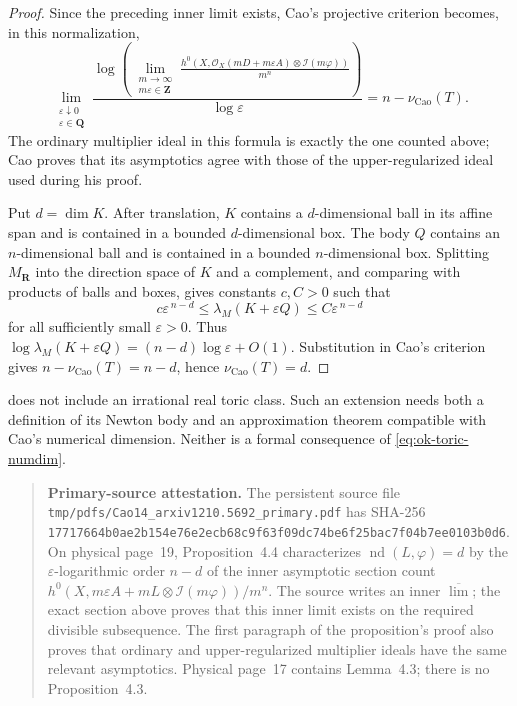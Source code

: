 \begin{proof}
Since the preceding inner limit exists, Cao's projective criterion
\cite[Proposition~4.4]{Cao14} becomes, in this normalization,
\[
 \lim_{\substack{\varepsilon\downarrow0\\
                  \varepsilon\in\mathbf Q}}
 \frac{\log\!\left(
   \displaystyle\lim_{\substack{m\to\infty\\m\varepsilon\in\mathbf Z}}
   \frac{h^0\!\left(X,\mathcal O_X(mD+m\varepsilon A)
                    \otimes\mathcal I(m\varphi)\right)}{m^n}
   \right)}{\log\varepsilon}
 =n-\nu_{\mathrm{Cao}}(T).
\]
The ordinary multiplier ideal in this formula is exactly the one counted
above; Cao proves that its asymptotics agree with those of the
upper-regularized ideal used during his proof.

Put \(d=\dim K\).
After translation, \(K\) contains a \(d\)-dimensional ball in its affine
span and is contained in a bounded \(d\)-dimensional box.  The body \(Q\)
contains an \(n\)-dimensional ball and is contained in a bounded
\(n\)-dimensional box.  Splitting \(M_{\mathbf R}\) into the direction space
of \(K\) and a complement, and comparing with products of balls and boxes,
gives constants \(c,C>0\) such that
\[
 c\varepsilon^{\,n-d}
 \leq\lambda_M(K+\varepsilon Q)
 \leq C\varepsilon^{\,n-d}
\tag{55.52}\label{eq:ok-toric-tube-growth}
\]
for all sufficiently small \(\varepsilon>0\).
Thus
\(\log\lambda_M(K+\varepsilon Q)
 =(n-d)\log\varepsilon+O(1)\).  Substitution in Cao's criterion gives
\(n-\nu_{\mathrm{Cao}}(T)=n-d\), hence
\(\nu_{\mathrm{Cao}}(T)=d\).
\end{proof}

\begin{remark}
\label{rem:ok-toric-scope}
 does not include an irrational real toric
class.
Such an extension needs both a definition of its Newton body and an
approximation theorem compatible with Cao's numerical dimension.
Neither is a formal consequence of \eqref{eq:ok-toric-numdim}.
\end{remark}

\begin{quote}
\textbf{Primary-source attestation.}
The persistent source file
\texttt{tmp/pdfs/Cao14\_arxiv1210.5692\_primary.pdf} has SHA-256
\texttt{17717664b0ae2b154e76e2ecb68c9f63f09dc74be6f25bac7f04b7ee0103b0d6}.
On physical page~19, Proposition~4.4 characterizes
\(\operatorname{nd}(L,\varphi)=d\) by the \(\varepsilon\)-logarithmic order
\(n-d\) of the inner asymptotic section count
\(h^0(X,m\varepsilon A+mL\otimes\mathcal I(m\varphi))/m^n\).
The source writes an inner \(\overline{\lim}\); the exact section above proves
that this inner limit exists on the required divisible subsequence.  The first
paragraph of the proposition's proof also proves that ordinary and
upper-regularized multiplier ideals have the same relevant asymptotics.
Physical page~17 contains Lemma~4.3; there is no Proposition~4.3.
\end{quote}
%
